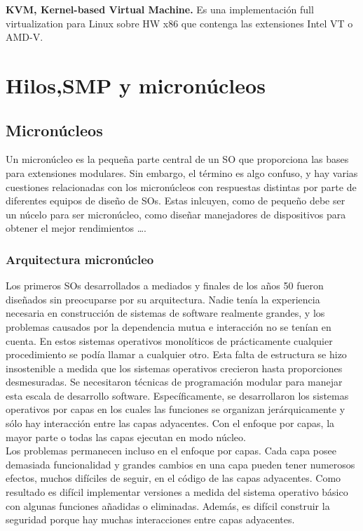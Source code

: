 \documentclass{article}
\begin{document}
			\textbf{KVM, Kernel-based Virtual Machine.} Es una implementación full virtualization para Linux sobre HW x86 que contenga las extensiones Intel VT o AMD-V.											
			
	\section{Hilos,SMP y micronúcleos}
		\subsection{Micronúcleos}
			Un micronúcleo es la pequeña parte central de un SO que proporciona las bases para extensiones modulares. Sin embargo, el término es algo confuso, y hay varias cuestiones relacionadas con los micronúcleos con respuestas distintas por parte de diferentes equipos de diseño de SOs. Estas inlcuyen, como de pequeño debe ser un núcelo para ser micronúcleo, como diseñar manejadores de dispositivos para obtener el mejor rendimientos \ldots . \\
			\subsubsection{Arquitectura micronúcleo}
				Los primeros SOs desarrollados a mediados y finales de los años 50 fueron diseñados sin preocuparse por su arquitectura. Nadie tenía la experiencia necesaria en construcción de sistemas de software realmente grandes, y los problemas causados por la dependencia mutua e interacción no se tenían en cuenta. En estos sistemas operativos monolíticos de prácticamente cualquier procedimiento se podía llamar a cualquier otro. Esta falta de estructura se hizo insostenible a medida que los sistemas operativos crecieron hasta proporciones desmesuradas. Se necesitaron técnicas de programación modular para manejar esta escala de desarrollo software. Específicamente, se desarrollaron los sistemas operativos por capas en los cuales las funciones se organizan jerárquicamente y sólo hay interacción entre las capas adyacentes. Con el enfoque por capas, la mayor parte o todas las capas ejecutan en modo núcleo. \\
				
				Los problemas permanecen incluso en el enfoque por capas. Cada capa posee demasiada funcionalidad y grandes cambios en una capa pueden tener numerosos efectos, muchos difíciles de seguir, en el código de las capas adyacentes. Como resultado es difícil implementar versiones a medida del sistema operativo básico con algunas funciones añadidas o eliminadas. Además, es difícil construir la seguridad porque hay muchas interacciones entre capas adyacentes. \\
				
\end{document}
